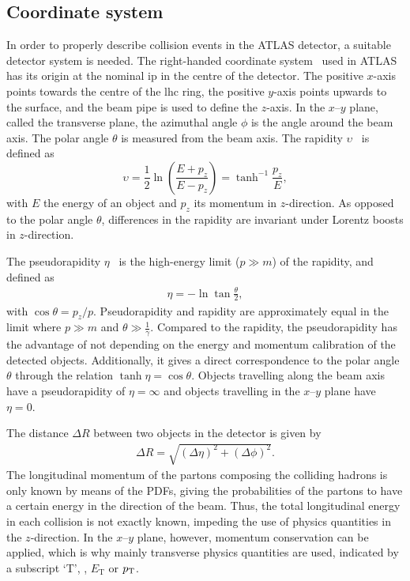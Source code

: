 \subsection{Coordinate system}

In order to properly describe collision events in the ATLAS detector, a suitable detector system is needed. The right-handed coordinate system~\cite{ATLAS:1999uwa} used in ATLAS has its origin at the nominal \gls{ip} in the centre of the detector. The positive $x$-axis points towards the centre of the \gls{lhc} ring, the positive $y$-axis points upwards to the surface, and the beam pipe is used to define the $z$-axis. In the $x$--$y$ plane, called the transverse plane, the azimuthal angle $\phi$ is the angle around the beam axis. The polar angle $\theta$ is measured from the beam axis. The rapidity $\upsilon$~\cite{pdg2020} is defined as
\begin{equation}
	\upsilon = \frac{1}{2}\ln\left(\frac{E+p_z}{E-p_z}\right) = \tanh^{-1}{\frac{p_z}{E}},
\end{equation}
with $E$ the energy of an object and $p_z$ its momentum in $z$-direction. As opposed to the polar angle $\theta$, differences in the rapidity are invariant under Lorentz boosts in $z$-direction.

The pseudorapidity $\eta$~\cite{pdg2020} is the high-energy limit ($p\gg m$) of the rapidity, and defined as
\begin{align}
	\eta = - \ln\tan\frac{\theta}{2},
\end{align}
with $\cos\theta = p_z/p$. Pseudorapidity and rapidity are approximately equal in the limit where $p\gg m$ and $\theta \gg \frac{1}{\gamma}$. Compared to the rapidity, the pseudorapidity has the advantage of not depending on the energy and momentum calibration of the detected objects. Additionally, it gives a direct correspondence to the polar angle $\theta$ through the relation $\tanh\eta = \cos\theta$. Objects travelling along the beam axis have a pseudorapidity of $\eta = \infty$ and objects travelling in the $x$--$y$ plane have $\eta = 0$.

The distance $\Delta R$ between two objects in the detector is given by
\begin{align}
	\Delta R=\sqrt{\left(\Delta \eta\right)^2+\left(\Delta \phi\right)^2}.
\end{align}
The longitudinal momentum of the partons composing the colliding hadrons is only known by means of the \glspl{PDF}, giving the probabilities of the partons to have a certain energy in the direction of the beam. Thus, the total longitudinal energy in each collision is not exactly known, impeding the use of physics quantities in the $z$-direction. In the $x$--$y$ plane, however, momentum conservation can be applied, which is why mainly transverse physics quantities are used, indicated by a subscript `T', \eg, $E_\mathrm{T}$ or $p_{\textrm{T}}$.

